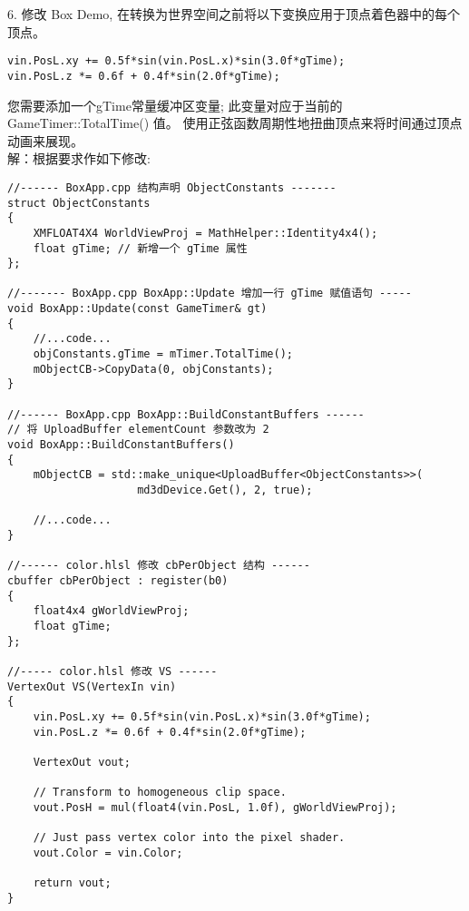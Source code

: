 \begin{flushleft}
6. 修改 Box Demo, 在转换为世界空间之前将以下变换应用于顶点着色器中的每个顶点。
\end{flushleft}
\begin{lstlisting}
vin.PosL.xy += 0.5f*sin(vin.PosL.x)*sin(3.0f*gTime);
vin.PosL.z *= 0.6f + 0.4f*sin(2.0f*gTime);
\end{lstlisting}
\begin{flushleft}
您需要添加一个gTime常量缓冲区变量; 此变量对应于当前的 GameTimer::TotalTime() 值。 使用正弦函数周期性地扭曲顶点来将时间通过顶点动画来展现。\\
解：根据要求作如下修改:
\end{flushleft}
\begin{lstlisting}
//------ BoxApp.cpp 结构声明 ObjectConstants -------
struct ObjectConstants
{
    XMFLOAT4X4 WorldViewProj = MathHelper::Identity4x4();
    float gTime; // 新增一个 gTime 属性
};

//------- BoxApp.cpp BoxApp::Update 增加一行 gTime 赋值语句 -----
void BoxApp::Update(const GameTimer& gt)
{
    //...code...
    objConstants.gTime = mTimer.TotalTime();
    mObjectCB->CopyData(0, objConstants);
}

//------ BoxApp.cpp BoxApp::BuildConstantBuffers ------ 
// 将 UploadBuffer elementCount 参数改为 2
void BoxApp::BuildConstantBuffers()
{
    mObjectCB = std::make_unique<UploadBuffer<ObjectConstants>>(
                    md3dDevice.Get(), 2, true);

    //...code...
}

//------ color.hlsl 修改 cbPerObject 结构 ------
cbuffer cbPerObject : register(b0)
{
    float4x4 gWorldViewProj;
    float gTime;
};

//----- color.hlsl 修改 VS ------
VertexOut VS(VertexIn vin)
{
    vin.PosL.xy += 0.5f*sin(vin.PosL.x)*sin(3.0f*gTime);
    vin.PosL.z *= 0.6f + 0.4f*sin(2.0f*gTime);

    VertexOut vout;

    // Transform to homogeneous clip space.
    vout.PosH = mul(float4(vin.PosL, 1.0f), gWorldViewProj);
    
    // Just pass vertex color into the pixel shader.
    vout.Color = vin.Color;

    return vout;
}
\end{lstlisting}

